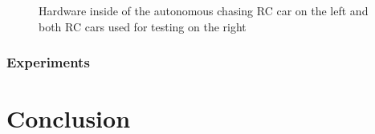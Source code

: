 \begin{figure}[h!]
    \centering
    \qquad
    \caption{Hardware inside of the autonomous chasing RC car on the left and both RC cars used for testing on the right}%
    \label{fig:rc_cars}%
\end{figure}



\subsection{Experiments}



\chapter{Conclusion}






